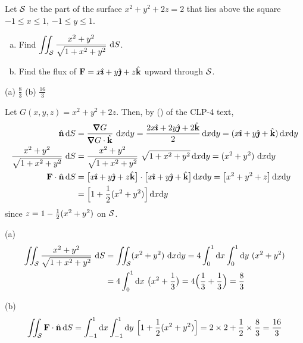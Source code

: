 \begin{question}[M317 2000A] %
 Let $\mathcal{S}$ be the part of the surface $x^2+y^2+2z=2$ that
lies above the square $-1\le x\le 1$, $-1\le y\le 1$.
\begin{enumerate}[(a)]
\item
Find $\displaystyle\iint_{\mathcal{S}} \frac{x^2+y^2}{\sqrt{1+x^2+y^2}}\ \mathrm{d}S$.
\item
Find the flux of $\mathbf{F}=x\hat{\pmb{\imath}}+y\hat{\pmb{\jmath}}+z\hat{\mathbf{k}}$ upward through $\mathcal{S}$.
\end{enumerate}
\end{question}


\begin{answer} 
(a) $\frac{8}{3}$\qquad
(b) $\frac{16}{3}$
\end{answer}

\begin{solution} 
Let $G(x,y,z) = x^2+y^2+2z$. Then, 
by () of the CLP-4 text,
\begin{align*}
\hn\,\dee{S}&=\frac{\vnabla G}{\vnabla G\cdot\hk}\ \dee{x}\dee{y}
=\frac{2x\hi+2y\hj+2\hk}{2}\,\dee{x}\dee{y}
=(x\hi+y\hj+\hk)\,\dee{x}\dee{y} \\
\frac{x^2+y^2}{\sqrt{1+x^2+y^2}}\ \dee{S}
&=\frac{x^2+y^2}{\sqrt{1+x^2+y^2}}\ \sqrt{1+x^2+y^2}\,\dee{x}\dee{y}
=(x^2+y^2)\ \dee{x}\dee{y}\\
\vF\cdot\hn\,\dee{S}
&=\big[x\hi+y\hj+z\hk\big]\cdot\big[x\hi+y\hj+\hk\big]\,\dee{x}\dee{y}
=\big[x^2+y^2+z\big]\,\dee{x}\dee{y} \\
&=\Big[1+\frac{1}{2}(x^2+y^2)\Big]\,\dee{x}\dee{y}
\end{align*}
since $z=1-\tfrac{1}{2}(x^2+y^2)$ on $\mathcal{S}$.

(a)
\begin{align*}
\iint_{\mathcal{S}} \frac{x^2+y^2}{\sqrt{1+x^2+y^2}}\ \mathrm{d}S
&=\iint_{\mathcal{S}} (x^2+y^2)\ \mathrm{d}x\mathrm{d}y
=4\int_0^1\mathrm{d}x\int_0^1\mathrm{d}y\ (x^2+y^2) \\
&=4\int_0^1\mathrm{d}x\ \big(x^2+\frac{1}{3}\big)
=4\Big(\frac{1}{3}+\frac{1}{3}\Big)
=\frac{8}{3}
\end{align*}

(b)
$$
\iint_{\mathcal{S}} \mathbf{F}\cdot\hat{\mathbf{n}}\,\mathrm{d}S
=\int_{-1}^1\mathrm{d}x\int_{-1}^1\mathrm{d}y\ \Big[1+\frac{1}{2}(x^2+y^2)\Big]
=2\times 2+\frac{1}{2}\times\frac{8}{3}
=\frac{16}{3}
$$
\end{solution}

